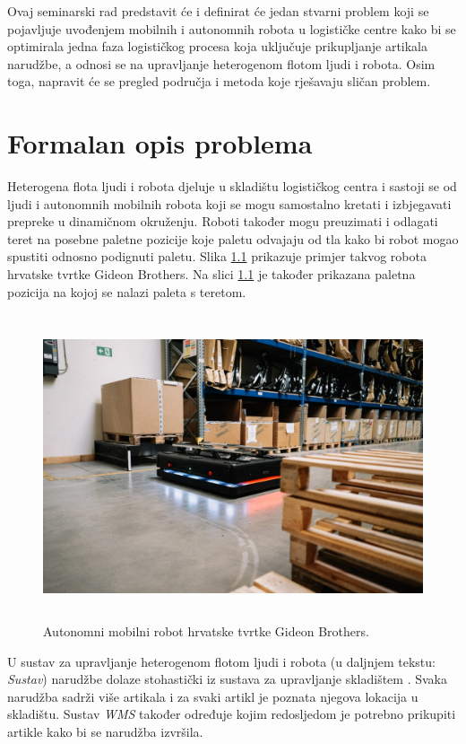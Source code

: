 \documentclass[times, utf8, seminar]{fer}
\begin{document}
\pagebreak

Ovaj seminarski rad predstavit će i definirat će jedan stvarni problem koji
se pojavljuje uvođenjem mobilnih i autonomnih robota u logističke centre kako bi se
optimirala jedna faza logističkog procesa koja uključuje prikupljanje
artikala narudžbe, a odnosi se na upravljanje heterogenom flotom ljudi i robota.
Osim toga, napravit će se pregled područja i 
metoda koje rješavaju sličan problem.

\chapter{Formalan opis problema}
Heterogena flota ljudi i robota djeluje u skladištu logističkog centra i sastoji
se od ljudi i autonomnih mobilnih robota  koji se
mogu samostalno kretati i izbjegavati prepreke u dinamičnom okruženju. Roboti
također mogu preuzimati i odlagati teret na posebne paletne pozicije koje
paletu odvajaju od tla kako bi robot mogao spustiti odnosno podignuti paletu.
Slika \ref{fig:robot-01} prikazuje primjer takvog robota hrvatske tvrtke Gideon Brothers.
Na slici \ref{fig:robot-01} je također prikazana paletna pozicija na kojoj se nalazi
paleta s teretom.

\begin{figure}[htb]
    \centering
    \includegraphics[height=9cm]{images/robot-01.jpg}
    \caption{Autonomni mobilni robot hrvatske tvrtke Gideon Brothers. \citep{Gideon:Logisticsrobotlingo}}
    \label{fig:robot-01}
\end{figure}

\pagebreak

U sustav za upravljanje heterogenom flotom ljudi i robota 
(u daljnjem tekstu: \emph{Sustav}) narudžbe dolaze stohastički iz
sustava za upravljanje skladištem .
Svaka narudžba sadrži više artikala i za svaki artikl je poznata njegova lokacija u skladištu.
Sustav \emph{WMS} također određuje kojim redosljedom je potrebno prikupiti artikle kako bi
se narudžba izvršila.
\end{document}
